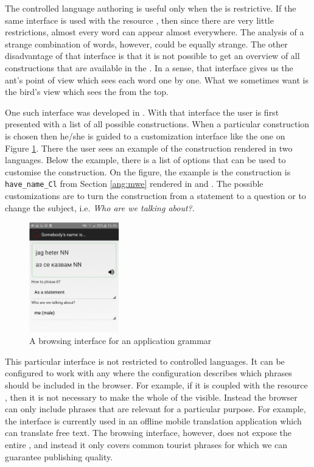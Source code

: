 \documentclass[output=paper]{langsci/langscibook}
\begin{document}
The controlled language authoring is useful only when the 
is restrictive. If the same interface is used with the resource ,
then since there are very little restrictions, almost every word can
appear almost everywhere. The analysis of a strange combination of words,
however, could be equally strange. The other disadvantage of that 
interface is that it is not possible to get an overview of 
all constructions that are available in the . In a sense, that
interface gives us the ant's point of view which sees each word
one by one. What we sometimes want is the bird's view which sees the
 from the top. 

One such interface was developed in \cite{parlira}. With that interface 
the user is first presented with a list of all possible constructions. 
When a particular construction is chosen then he/she is guided to 
a customization interface
like the one on Figure \ref{ang:fig:parlira}. There the user sees an example
of the construction rendered in two languages. Below the example,
there is a list of options that can be used to customise the construction.
On the figure, the example is the construction is \verb=have_name_Cl= from
Section \ref{ang:mwe} rendered in  and . The possible
customizations are to turn the construction from a statement to a question
or to change the subject, i.e. \textit{Who are we talking about?}.

\begin{figure}
\center
\includegraphics[width=0.35\textwidth]{figures/parlira1}
\caption{A browsing interface for an application grammar}
\label{ang:fig:parlira}
\end{figure}

This particular interface is not restricted to controlled languages.
It can be configured to work with any  where the configuration
describes which phrases should be included in the browser.
For example, if it is coupled with the resource , then it
is not necessary to make the whole of the  visible.
Instead the browser can only include phrases that are relevant
for a particular purpose. For example, the interface is currently used
in an offline mobile translation application \citep{angelov:android}
which can translate free text. The browsing interface, however,
does not expose the entire , and instead it only
covers common tourist phrases for which we can guarantee publishing
quality.
\end{document}
